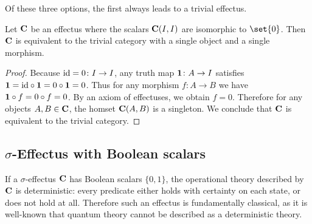 \documentclass[%
	submission,
copyright,creativecommons,UKenglish]{eptcs}
\begin{document}
Of these three options, the first always leads to a trivial effectus.

\begin{proposition}
  Let $\mathbf{C}$ be an effectus where the scalars $\mathbf{C}(I,I)$ are
  isomorphic to $\set{0}$. Then $\mathbf{C}$ is equivalent to the trivial
  category with a single object and a single morphism.
\end{proposition}
\begin{proof}
Because $\mathrm{id}=0\colon I\to I$, any truth map $\mathbf{1}\colon A\to I$
satisfies $\mathbf{1}=\mathrm{id}\circ\mathbf{1}=0\circ \mathbf{1}=0$.
Thus for any morphism $f\colon A\to B$
we have $\mathbf{1}\circ f=0\circ f=0$.
By an axiom of effectuses, we obtain $f=0$.
Therefore for any objects $A,B\in\mathbf{C}$,
the homset $\mathbf{C}(A,B)$ is a singleton.
We conclude that
$\mathbf{C}$ is equivalent to the trivial category.
\end{proof}


\subsection{\texorpdfstring{$\sigma$}{sigma}-Effectus with Boolean scalars}



If a $\sigma$-effectus $\mathbf{C}$ has Boolean scalars $\{0,1\}$,
the operational theory described by $\mathbf{C}$ is deterministic:
every predicate either holds with certainty on each state,
or does not hold at all.
Therefore such an effectus is fundamentally classical,
as it is well-known that quantum theory
cannot be described as a deterministic theory.
\end{document}
